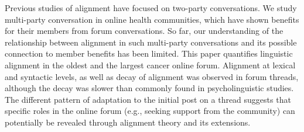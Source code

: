 Previous studies of alignment have focused on two-party conversations. We study multi-party conversation in online health communities, which have shown benefits for their members from forum conversations.  So far, our understanding of the relationship between alignment in such multi-party conversations and its possible connection to member benefits has been limited.  This paper quantifies linguistic alignment in the oldest and the largest cancer online forum. Alignment at lexical and syntactic levels, as well as decay of alignment was observed in forum threads, although the decay was slower than commonly found in psycholinguistic studies. The different pattern of adaptation to the initial post on a thread suggests that specific roles in the online forum (e.g., seeking support from the community) can potentially be revealed through alignment theory and its extensions.
